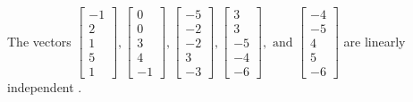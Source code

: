 \begin{exercise}
\begin{exerciseStatement}
  \end{exerciseStatement}
  \begin{exerciseAnswer}
   The vectors \(\left[\begin{array}{r}
-1 \\
2 \\
1 \\
5 \\
1
\end{array}\right] , \left[\begin{array}{r}
0 \\
0 \\
3 \\
4 \\
-1
\end{array}\right] , \left[\begin{array}{r}
-5 \\
-2 \\
-2 \\
3 \\
-3
\end{array}\right] , \left[\begin{array}{r}
3 \\
3 \\
-5 \\
-4 \\
-6
\end{array}\right] , \text{ and } \left[\begin{array}{r}
-4 \\
-5 \\
4 \\
5 \\
-6
\end{array}\right]\) are 
  	 linearly independent  .
  


  \end{exerciseAnswer}
\end{exercise}